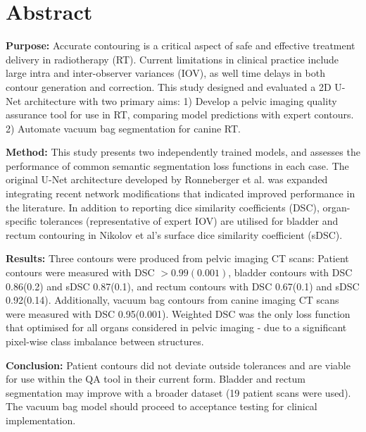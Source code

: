 \chapter{Abstract} \label{ch:abstract}

\textbf{Purpose:} Accurate contouring is a critical aspect of safe and effective
treatment delivery in radiotherapy (RT). Current limitations in clinical practice
include large intra and inter-observer variances (IOV), as well time delays in
both contour generation and correction. This study designed and evaluated a 2D U-Net architecture with
two primary aims: 
1) Develop a pelvic imaging quality assurance tool for use in
RT, comparing model predictions with expert contours. 2) Automate vacuum bag
segmentation for canine RT.

\textbf{Method:} This study presents two independently trained models, and
assesses the performance of common semantic segmentation loss functions in each
case. The original U-Net architecture developed by Ronneberger et al. was expanded
integrating recent network modifications that indicated improved performance in
the literature. In addition to reporting dice similarity coefficients (DSC), organ-specific tolerances (representative of expert IOV) are utilised for bladder
and rectum contouring in Nikolov et al's surface dice similarity coefficient
(sDSC).

\textbf{Results:} Three contours were produced from pelvic imaging CT scans:
Patient contours were measured with DSC $>0.99(0.001)$, bladder contours with
DSC 0.86(0.2) and sDSC 0.87(0.1), and rectum contours with DSC 0.67(0.1)
and sDSC 0.92(0.14).  Additionally, vacuum bag contours from canine imaging CT
scans were measured with DSC 0.95(0.001). Weighted DSC was the only loss function
that optimised for all organs considered in pelvic imaging - due to a
significant pixel-wise class imbalance between structures.

\textbf{Conclusion:} Patient contours did not deviate outside tolerances and are
viable for use within the QA tool in their current form.  Bladder and rectum
segmentation may improve with a broader dataset (19 patient scans were used).
The vacuum bag model should proceed to acceptance testing for clinical
implementation.
